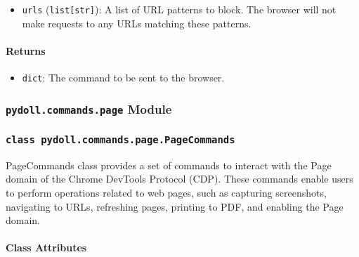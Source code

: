 \documentclass{article}
\begin{document}
\begin{itemize}
    \item \lstinline[style=pythonstyle]|urls| (\lstinline[style=pythonstyle]|list[str]|): A list of URL patterns to block. The browser will not make requests to any URLs matching these patterns.
\end{itemize}

\paragraph{Returns}

\begin{itemize}
    \item \lstinline[style=pythonstyle]|dict|: The command to be sent to the browser.
\end{itemize}

\subsubsection*{\texttt{pydoll.commands.page} Module}

\subsubsection*{\texttt{class pydoll.commands.page.PageCommands}}
\noindent PageCommands class provides a set of commands to interact with the Page domain of the Chrome DevTools Protocol (CDP). These commands enable users to perform operations related to web pages, such as capturing screenshots, navigating to URLs, refreshing pages, printing to PDF, and enabling the Page domain.

\paragraph{Class Attributes}
\end{document}
